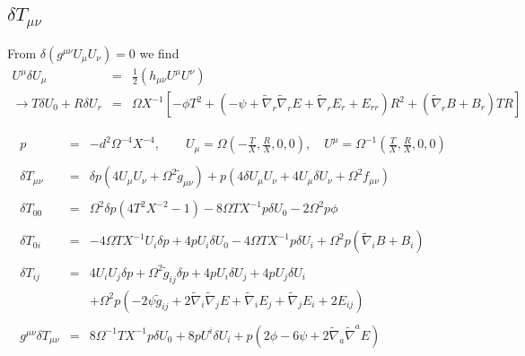 \documentclass[10pt,letterpaper]{article}
\numberwithin{equation}{section}
\begin{document}
\subsection{$\delta T_{\mu\nu}$}
From $\delta(g^{\mu\nu}U_\mu U_\nu)=0$ we find
\begin{eqnarray}
U^\mu \delta U_\mu &=& \frac12 \left( h_{\mu\nu} U^\mu U^\nu\right)
\nonumber\\
\to T\delta U_0 + R\delta U_r &=& \Omega X^{-1} \left[ -\phi T^2 + (-\psi + \tilde\nabla_r\tilde\nabla_r E + \tilde\nabla_r E_r + E_{rr})R^2 + (\tilde\nabla_r B + B_r)TR\right]
\end{eqnarray}

\begin{eqnarray}
p &=& -d^2 \Omega^{-4} X^{-4},\qquad U_\mu = \Omega \left( -\frac{T}{X},\frac{R}{X},0,0\right),\quad U^\mu = \Omega^{-1}\left(\frac{T}{X},\frac{R}{X},0,0\right)
\\ \nonumber\\
 \delta T_{\mu\nu} &=& \delta p(4 U_\mu U_\nu + \Omega^2\tilde g_{\mu\nu})+ p\left(
4 \delta U_\mu U_\nu + 4U_\mu \delta U_\nu + \Omega^2 f_{\mu\nu}\right)
\\ \nonumber\\
 \delta T_{00} &=& \Omega^2 \delta p (4T^2X^{-2} -1) -8\Omega T X^{-1} p \delta U_0 - 2\Omega^2 p \phi
\\ \nonumber\\
 \delta T_{0i} &=& -4\Omega T X^{-1} U_i \delta p + 4p U_i \delta U_0 - 4\Omega T X^{-1}  p \delta U_i
 +\Omega^2 p (\tilde\nabla_i B+B_i)
\\ \nonumber\\
 \delta T_{ij} &=& 4 U_i U_j \delta p + \Omega^2 \tilde g_{ij} \delta p + 4p U_i \delta U_j + 4p U_j \delta U_i
 \nonumber\\
 &&+ \Omega^2 p (-2\psi\tilde g_{ij} + 2\tilde\nabla_i\tilde\nabla_j E + \tilde\nabla_i E_j + \tilde\nabla_j E_i + 2E_{ij})
\\ \nonumber\\
g^{\mu\nu}\delta T_{\mu\nu} &=& 8\Omega^{-1}T X^{-1} p \delta U_0 + 8p U^i \delta U_i + p (2\phi-6\psi+2\tilde\nabla_a\tilde\nabla^a E)
\end{eqnarray}
\end{document}
